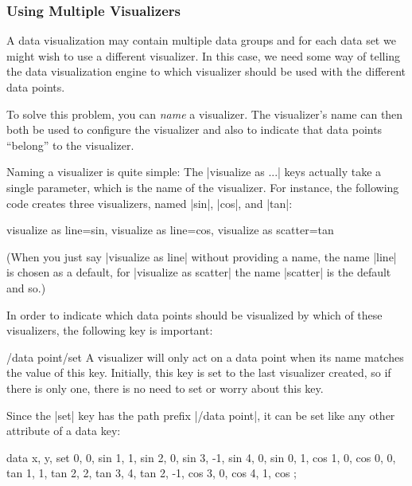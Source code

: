 \subsubsection{Using Multiple Visualizers}

A data visualization may contain multiple data groups and for each data set we
might wish to use a different visualizer. In this case, we need some way of
telling the data visualization engine to which visualizer should be used with
the different data points.

To solve this problem, you can \emph{name} a visualizer. The visualizer's name
can then both be used to configure the visualizer and also to indicate that
data points ``belong'' to the visualizer.

Naming a visualizer is quite simple: The |visualize as ...| keys actually take
a single parameter, which is the name of the visualizer. For instance, the
following code creates three visualizers, named |sin|, |cos|, and |tan|:
%
\begin{codeexample}
visualize as line=sin,
visualize as line=cos,
visualize as scatter=tan
\end{codeexample}

(When you just say |visualize as line| without providing a name, the name
|line| is chosen as a default, for |visualize as scatter| the name |scatter| is
the default and so.)

In order to indicate which data points should be visualized by which of these
visualizers, the following key is important:

\begin{key}{/data point/set}
    A visualizer will only act on a data point when its name matches the value
    of this key. Initially, this key is set to the last visualizer created, so
    if there is only one, there is no need to set or worry about this key.
\end{key}

Since the |set| key has the path prefix |/data point|, it can be set like any
other attribute of a data key:
%
\begin{codeexample}[width=7cm,preamble={\usetikzlibrary{datavisualization}}]
\tikz \datavisualization
 [scientific axes=clean,
  visualize as line=sin,
  visualize as line=cos,
  visualize as scatter=tan]
data {
  x, y, set
  0, 0, sin
  1, 1, sin
  2, 0, sin
  3, -1, sin
  4, 0, sin
  0, 1, cos
  1, 0, cos
  0, 0, tan
  1, 1, tan
  2, 2, tan
  3, 4, tan
  2, -1, cos
  3, 0, cos
  4, 1, cos
};
\end{codeexample}

